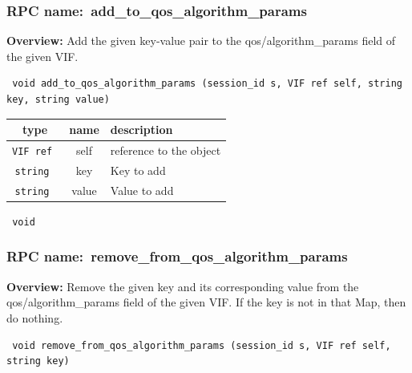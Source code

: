 \subsubsection{RPC name:~add\_to\_qos\_algorithm\_params}

{\bf Overview:} 
Add the given key-value pair to the qos/algorithm\_params field of the
given VIF.

\begin{verbatim} void add_to_qos_algorithm_params (session_id s, VIF ref self, string key, string value)\end{verbatim}



 
\vspace{0.3cm}
\begin{tabular}{|c|c|p{7cm}|}
 \hline
{\bf type} & {\bf name} & {\bf description} \\ \hline
{\tt VIF ref } & self & reference to the object \\ \hline 

{\tt string } & key & Key to add \\ \hline 

{\tt string } & value & Value to add \\ \hline 

\end{tabular}

\vspace{0.3cm}

{\tt 
void
}



\vspace{0.3cm}
\vspace{0.3cm}
\vspace{0.3cm}
\subsubsection{RPC name:~remove\_from\_qos\_algorithm\_params}

{\bf Overview:} 
Remove the given key and its corresponding value from the
qos/algorithm\_params field of the given VIF.  If the key is not in that
Map, then do nothing.

\begin{verbatim} void remove_from_qos_algorithm_params (session_id s, VIF ref self, string key)\end{verbatim}




